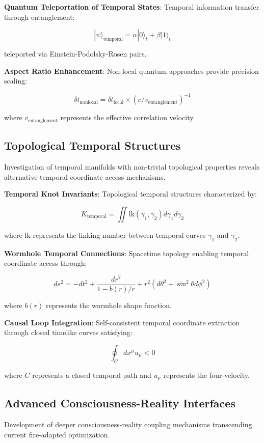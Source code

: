 \documentclass[11pt]{article}
\theoremstyle{remark}
\begin{document}
\textbf{Quantum Teleportation of Temporal States}: Temporal information transfer through entanglement:

$$|\psi\rangle_{\text{temporal}} = \alpha|0\rangle_t + \beta|1\rangle_t$$

teleported via Einstein-Podolsky-Rosen pairs.

\textbf{Aspect Ratio Enhancement}: Non-local quantum approaches provide precision scaling:

$$\delta t_{\text{nonlocal}} = \delta t_{\text{local}} \times (c/v_{\text{entanglement}})^{-1}$$

where $v_{\text{entanglement}}$ represents the effective correlation velocity.

\subsection{Topological Temporal Structures}

Investigation of temporal manifolds with non-trivial topological properties reveals alternative temporal coordinate access mechanisms.

\textbf{Temporal Knot Invariants}: Topological temporal structures characterized by:

$$K_{\text{temporal}} = \iint \text{lk}(\gamma_1,\gamma_2) d\gamma_1 d\gamma_2$$

where $\text{lk}$ represents the linking number between temporal curves $\gamma_1$ and $\gamma_2$.

\textbf{Wormhole Temporal Connections}: Spacetime topology enabling temporal coordinate access through:

$$ds^2 = -dt^2 + \frac{dr^2}{1-b(r)/r} + r^2(d\theta^2 + \sin^2\theta d\phi^2)$$

where $b(r)$ represents the wormhole shape function.

\textbf{Causal Loop Integration}: Self-consistent temporal coordinate extraction through closed timelike curves satisfying:

$$\oint_C dx^\mu u_\mu < 0$$

where $C$ represents a closed temporal path and $u_\mu$ represents the four-velocity.

\subsection{Advanced Consciousness-Reality Interfaces}

Development of deeper consciousness-reality coupling mechanisms transcending current fire-adapted optimization.
\end{document}
